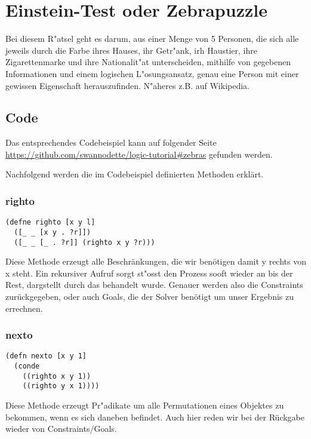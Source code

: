 \section{Einstein-Test oder Zebrapuzzle}

Bei diesem R"atsel geht es darum, aus einer Menge von 5 Personen, die sich alle jeweils durch die Farbe ihres Hauses, ihr Getr"ank, irh Haustier, ihre Zigarettenmarke und ihre Nationalit"at unterscheiden, mithilfe von gegebenen Informationen und einem logischen L"osungsansatz, genau eine Person mit einer gewissen Eigenschaft herauszufinden. N"aheres z.B. auf Wikipedia.

\subsection{Code}

Das entsprechendes Codebeispiel kann auf folgender Seite \url{https://github.com/swannodette/logic-tutorial#zebras} gefunden werden.


Nachfolgend werden die im Codebeispiel definierten Methoden erklärt.

\subsubsection{righto}

\begin{lstlisting}
(defne righto [x y l]
  ([_ _ [x y . ?r]])
  ([_ _ [_ . ?r]] (righto x y ?r)))
\end{lstlisting}

Diese Methode erzeugt alle Beschränkungen, die wir benötigen damit \dq{}y\dq{} rechts von \dq{}x\dq{} steht. Ein rekursiver Aufruf sorgt st"oss{}t den Prozess sooft wieder an bis der Rest, dargstellt durch das  behandelt wurde. Genauer werden also die Constraints zurückgegeben, oder auch Goals, die der Solver benötigt um unser Ergebnis zu errechnen.

\subsubsection{nexto}

\begin{lstlisting}
(defn nexto [x y 1]
  (conde
    ((righto x y 1))
    ((righto y x 1))))
\end{lstlisting}

Diese Methode erzeugt Pr"adikate um alle Permutationen eines Objektes zu bekommen, wenn es sich daneben befindet. Auch hier reden wir bei der Rückgabe wieder von Constraints/Goals.

